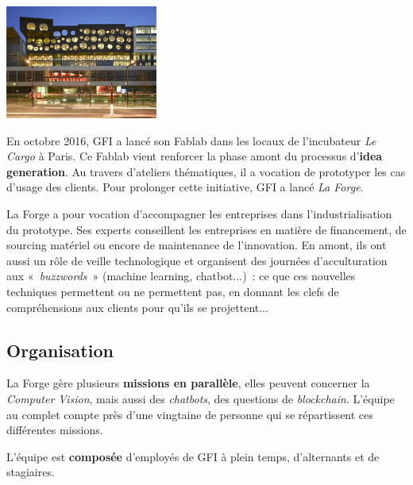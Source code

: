 \begin{minipage}{0.3\textwidth}
  \centering
  \includegraphics[width=5cm, trim={0 0.5cm 0 0.2cm},clip]{img/cargo.jpg}
\end{minipage}
\hfill%
\begin{minipage}[adjusting]{0.6\textwidth}
 \hspace{\parindent}En octobre 2016, GFI a lancé son Fablab dans les locaux de l'incubateur \textit{Le Cargo} à Paris. Ce Fablab vient renforcer la phase amont du processus d’\textbf{idea generation}. Au travers d’ateliers thématiques, il a vocation de prototyper les cas d’usage des clients.  Pour prolonger cette initiative, GFI a lancé \textit{La Forge}.
\end{minipage}\par

La Forge a pour vocation d'accompagner les entreprises dans l'industrialisation du prototype. Ses experts conseillent les entreprises en matière de financement, de sourcing matériel ou encore de maintenance de l'innovation. En amont, ils ont aussi un rôle de veille technologique et organisent des journées d'acculturation aux «~\textit{buzzwords}~» (machine learning, chatbot...)~: ce que ces nouvelles techniques permettent ou ne permettent pas, en donnant les clefs de compréhensions aux clients pour qu'ils se projettent...

\subsection{Organisation}

La Forge gère plusieurs \textbf{missions en parallèle}, elles peuvent concerner la \textit{Computer Vision}, mais aussi des \textit{chatbots}, des questions de \textit{blockchain}. L'équipe au complet compte près d'une vingtaine de personne qui se répartissent ces différentes missions.

L'équipe est \textbf{composée} d'employés de GFI à plein temps, d'alternants et de stagiaires. 



\newpage
